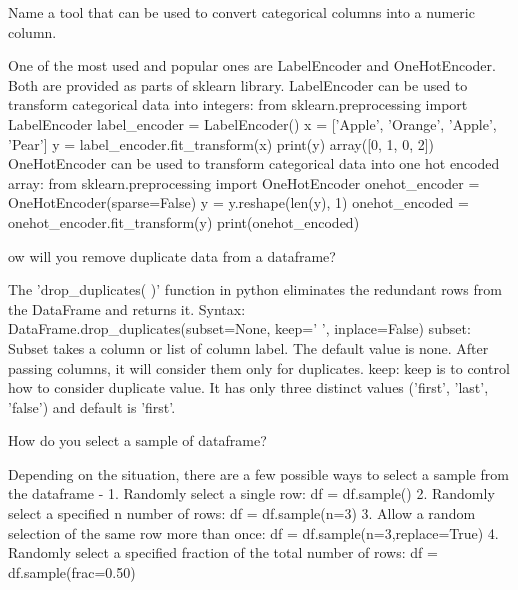 	\begin{qanda}
		\begin{question}
Name a tool that can be used to convert categorical columns into a numeric column.
		\end{question}
		\begin{answer}
One of the most used and popular ones are LabelEncoder and OneHotEncoder. Both are provided as parts of sklearn library. LabelEncoder can be used to transform categorical data into integers: from sklearn.preprocessing import LabelEncoder label\_encoder = LabelEncoder() x = ['Apple', 'Orange', 'Apple', 'Pear'] y = label\_encoder.fit\_transform(x) print(y) array([0, 1, 0, 2]) OneHotEncoder can be used to transform categorical data into one hot encoded array: from sklearn.preprocessing import OneHotEncoder onehot\_encoder = OneHotEncoder(sparse=False) y = y.reshape(len(y), 1) onehot\_encoded = onehot\_encoder.fit\_transform(y) print(onehot\_encoded)
		\end{answer}
	\end{qanda}

	\begin{qanda}
		\begin{question}
ow will you remove duplicate data from a dataframe?
		\end{question}
		\begin{answer}
The 'drop\_duplicates( )' function in python eliminates the redundant rows from the DataFrame and returns it.  Syntax: DataFrame.drop\_duplicates(subset=None, keep=' ', inplace=False) subset: Subset takes a column or list of column label.  The default value is none.  After passing columns, it will consider them only for duplicates.  keep: keep is to control how to consider duplicate value.  It has only three distinct values ('first', 'last', 'false') and default is 'first'.
		\end{answer}
	\end{qanda}

	\begin{qanda}
		\begin{question}
How do you select a sample of dataframe?
		\end{question}
		\begin{answer}
Depending on the situation, there are a few possible ways to select a sample from the dataframe - 1. Randomly select a single row: df = df.sample() 2. Randomly select a specified n number of rows: df = df.sample(n=3) 3. Allow a random selection of the same row more than once: df = df.sample(n=3,replace=True) 4. Randomly select a specified fraction of the total number of rows: df = df.sample(frac=0.50)
		\end{answer}
	\end{qanda}

